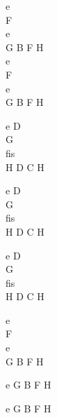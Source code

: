 \begin{chord}
    e\\
    F\\
    e\\
    G B F H\\
    e\\
    F\\
    e\\
    G B F H

    e D\\
    G\\
    fis\\
    H D C H

    e D\\
    G\\
    fis\\
    H D C H

    e D\\
    G\\
    fis\\
    H D C H

    e\\
    F\\
    e\\
    G B F H

    e G B F H

    e G B F H
\end{chord}